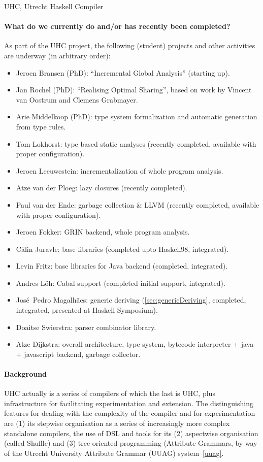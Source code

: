 \begin{hcarentry}{UHC, Utrecht Haskell Compiler}
\paragraph{What do we currently do and/or has recently been completed?}
As part of the UHC project, the following (student) projects and other activities are underway (in arbitrary order):
\begin{itemize}
\item Jeroen Bransen (PhD): ``Incremental Global Analysis'' (starting up).
\item Jan Rochel (PhD): ``Realising Optimal Sharing'', based on work by Vincent van Oostrum and Clemens Grabmayer.
\item Arie Middelkoop (PhD): type system formalization and automatic generation from type rules.
\item Tom Lokhorst: type based static analyses (recently completed, available with proper configuration).
\item Jeroen Leeuwestein: incrementalization of whole program analysis.
\item Atze van der Ploeg: lazy closures (recently completed).
\item Paul van der Ende: garbage collection \& LLVM (recently completed, available with proper configuration).
\item Jeroen Fokker: GRIN backend, whole program analysis.
\item C\u{a}lin Juravle: base libraries (completed upto Haskell98, integrated).
\item Levin Fritz: base libraries for Java backend (completed, integrated).
\item Andres L\"oh: Cabal support (completed initial support, integrated).
\item Jos\'e~Pedro Magalh\~{a}es: generic deriving (\cref{sec:genericDeriving}, completed, integrated, presented at Haskell Symposium).
\item Doaitse Swierstra: parser combinator library.
\item Atze Dijkstra: overall architecture, type system, bytecode interpreter + java + javascript backend, garbage collector.
\end{itemize}

\paragraph{Background}

UHC actually is a series of compilers of which the last is UHC, plus
infrastructure for facilitating experimentation and extension.
The distinguishing features for dealing with the complexity of the compiler and for experimentation are
(1) its stepwise organisation as a series of increasingly more complex standalone compilers,
the use of DSL and tools for its (2) aspectwise organisation (called Shuffle) and
(3) tree-oriented programming (Attribute Grammars, by way of the
Utrecht University Attribute Grammar (UUAG) system~\cref{uuag}.
%


\end{hcarentry}
